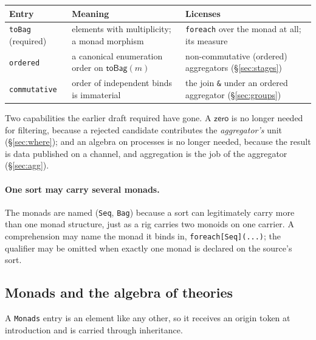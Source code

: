 \documentclass[11pt]{article}
\theoremstyle{branddef}
\theoremstyle{brandplain}
\theoremstyle{brandrem}
\newcommand{\zero}{\mathsf{zero}}
\newcommand{\fe}{\texttt{foreach}}
\begin{document}
\begin{center}
\small
\begin{tabular}{@{}L{0.17\textwidth}L{0.33\textwidth}L{0.40\textwidth}@{}}
\toprule
\textbf{Entry} & \textbf{Meaning} & \textbf{Licenses} \\
\midrule
\texttt{toBag} (required) & elements with multiplicity; a monad morphism &
\fe{} over the monad at all; its measure \\[3pt]
\texttt{ordered} & a canonical enumeration order on \(\mathsf{toBag}(m)\) &
non-commutative (ordered) aggregators (\S\ref{sec:stages}) \\[3pt]
\texttt{commutative} & order of independent binds is immaterial~\cite{Kock70} &
the join \texttt{\&} under an ordered aggregator (\S\ref{sec:groups}) \\
\bottomrule
\end{tabular}
\end{center}

\noindent
Two capabilities the earlier draft required have gone. A \(\zero\) is no longer
needed for filtering, because a rejected candidate contributes the
\emph{aggregator's} unit (\S\ref{sec:where}); and an algebra on processes is no
longer needed, because the result is data published on a channel, and
aggregation is the job of the aggregator (\S\ref{sec:agg}).

\paragraph{One sort may carry several monads.} The monads are named
(\texttt{Seq}, \texttt{Bag}) because a sort can legitimately carry more than
one monad structure, just as a rig carries two monoids on one carrier. A
comprehension may name the monad it binds in, \texttt{foreach[Seq](...)};
the qualifier may be omitted when exactly one monad is declared on the
source's sort.

\subsection{Monads and the algebra of theories}
\label{sec:modules}

A \texttt{Monads} entry is an element like any other, so it receives an origin
token at introduction and is carried through inheritance.
\end{document}
